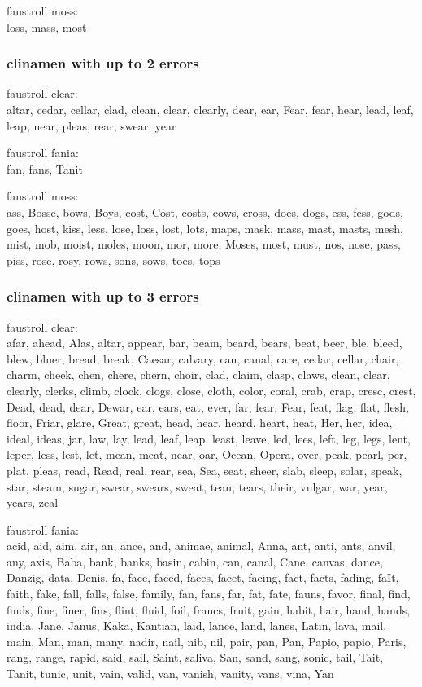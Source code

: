 faustroll moss:\\
loss, mass, most

\subsubsection{clinamen with up to 2 errors}
faustroll clear:\\
altar, cedar, cellar, clad, clean, clear, clearly, dear, ear, Fear, fear, hear, lead, leaf, leap, near, pleas, rear, swear, year

faustroll fania:\\
fan, fans, Tanit

faustroll moss:\\
ass, Bosse, bows, Boys, cost, Cost, costs, cows, cross, does, dogs, ess, fess, gods, goes, host, kiss, less, lose, loss, lost, lots, maps, mask, mass, mast, masts, mesh, mist, mob, moist, moles, moon, mor, more, Moses, most, must, nos, nose, pass, piss, rose, rosy, rows, sons, sows, toes, tops

\subsubsection{clinamen with up to 3 errors}

faustroll clear:\\
afar, ahead, Alas, altar, appear, bar, beam, beard, bears, beat, beer, ble, bleed, blew, bluer, bread, break, Caesar, calvary, can, canal, care, cedar, cellar, chair, charm, cheek, chen, chere, chern, choir, clad, claim, clasp, claws, clean, clear, clearly, clerks, climb, clock, clogs, close, cloth, color, coral, crab, crap, cresc, crest, Dead, dead, dear, Dewar, ear, ears, eat, ever, far, fear, Fear, feat, flag, flat, flesh, floor, Friar, glare, Great, great, head, hear, heard, heart, heat, Her, her, idea, ideal, ideas, jar, law, lay, lead, leaf, leap, least, leave, led, lees, left, leg, legs, lent, leper, less, lest, let, mean, meat, near, oar, Ocean, Opera, over, peak, pearl, per, plat, pleas, read, Read, real, rear, sea, Sea, seat, sheer, slab, sleep, solar, speak, star, steam, sugar, swear, swears, sweat, tean, tears, their, vulgar, war, year, years, zeal

faustroll fania:\\
acid, aid, aim, air, an, ance, and, animae, animal, Anna, ant, anti, ants, anvil, any, axis, Baba, bank, banks, basin, cabin, can, canal, Cane, canvas, dance, Danzig, data, Denis, fa, face, faced, faces, facet, facing, fact, facts, fading, faIt, faith, fake, fall, falls, false, family, fan, fans, far, fat, fate, fauns, favor, final, find, finds, fine, finer, fins, flint, fluid, foil, francs, fruit, gain, habit, hair, hand, hands, india, Jane, Janus, Kaka, Kantian, laid, lance, land, lanes, Latin, lava, mail, main, Man, man, many, nadir, nail, nib, nil, pair, pan, Pan, Papio, papio, Paris, rang, range, rapid, said, sail, Saint, saliva, San, sand, sang, sonic, tail, Tait, Tanit, tunic, unit, vain, valid, van, vanish, vanity, vans, vina, Yan

